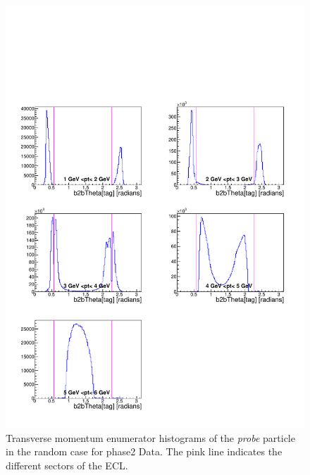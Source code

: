 \documentclass[a4paper,11pt,twosided,final,german,openbib,pdftex,listof=totoc,bibliography=totoc]{scrbook}
\begin{document}
\begin{appendix}
\begin{figure}[!htbp]
	\centering
	\includegraphics[width=\textwidth]{Plots/master/xPtMThetaRandomE_Data}
	\caption[Transverse Momentum $\theta$ Random Enumerator Histogram Phase2 Data]{Transverse momentum enumerator histograms of the \textit{probe} particle in the random case for phase2 Data. The pink line indicates the different sectors of the ECL.}
	\label{plt:PtMThetaRandomE_Data}
\end{figure}



\end{appendix}
\end{document}
